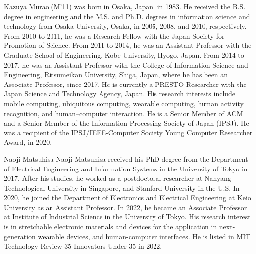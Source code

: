 \documentclass{ieeeaccess}
\begin{document}
 \begin{IEEEbiography}{Kazuya Murao} (M'11) was born in Osaka, Japan, in 1983. He received the B.S. degree in engineering and the M.S. and Ph.D. degrees in information science and technology from Osaka University, Osaka, in 2006, 2008, and 2010, respectively. From 2010 to 2011, he was a Research Fellow with the Japan Society for Promotion of Science. From 2011 to 2014, he was an Assistant Professor with the Graduate School of Engineering, Kobe University, Hyogo, Japan. From 2014 to 2017, he was an Assistant Professor with the College of Information Science and Engineering, Ritsumeikan University, Shiga, Japan, where he has been an Associate Professor, since 2017. He is currently a PRESTO Researcher with the Japan Science and Technology Agency, Japan. His research interests include mobile computing, ubiquitous computing, wearable computing, human activity recognition, and human–computer interaction. He is a Senior Member of ACM and a Senior Member of the Information Processing Society of Japan (IPSJ). He was a recipient of the IPSJ/IEEE-Computer Society Young Computer Researcher Award, in 2020.
 \end{IEEEbiography}

 \begin{IEEEbiography}{Naoji Matsuhisa} Naoji Matsuhisa received his PhD degree from the Department of Electrical Engineering and Information Systems in the University of Tokyo in 2017. After his studies, he worked as a postdoctoral researcher at Nanyang Technological University in Singapore, and Stanford University in the U.S. In 2020, he joined the Department of Electronics and Electrical Engineering at Keio University as an Assistant Professor. In 2022, he became an Associate Professor at Institute of Industrial Science in the University of Tokyo. His research interest is in stretchable electronic materials and devices for the application in next-generation wearable devices, and human-computer interfaces. He is listed in MIT Technology Review 35 Innovators Under 35 in 2022.
 \end{IEEEbiography}


\EOD
\end{document}
